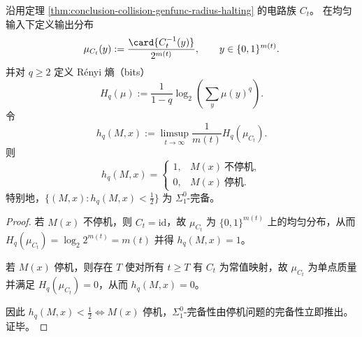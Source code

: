 \begin{corollary}\label{cor:conclusion-circuit-output-renyi-density-halting}
沿用定理 \ref{thm:conclusion-collision-genfunc-radius-halting} 的电路族 \(C_t\)。
在均匀输入下定义输出分布
\[
\mu_{C_t}(y):=\frac{\card{C_t^{-1}(y)}}{2^{m(t)}},\qquad y\in\{0,1\}^{m(t)}.
\]
并对 \(q\ge 2\) 定义 Rényi 熵（bits）
\[
H_q(\mu):=\frac{1}{1-q}\log_2\!\left(\sum_y \mu(y)^q\right).
\]
令
\[
h_q(M,x):=\limsup_{t\to\infty}\frac{1}{m(t)}H_q(\mu_{C_t}).
\]
则
\[
h_q(M,x)=
\begin{cases}
1,&M(x)\ \text{不停机},\\[2pt]
0,&M(x)\ \text{停机}.
\end{cases}
\]
特别地，\(\{(M,x):h_q(M,x)<\frac12\}\) 为 \(\Sigma^0_1\)-完备。
\end{corollary}
\begin{proof}
若 \(M(x)\) 不停机，则 \(C_t=\mathrm{id}\)，故 \(\mu_{C_t}\) 为 \(\{0,1\}^{m(t)}\) 上的均匀分布，从而
\(
H_q(\mu_{C_t})=\log_2 2^{m(t)}=m(t)
\)
并得 \(h_q(M,x)=1\)。

若 \(M(x)\) 停机，则存在 \(T\) 使对所有 \(t\ge T\) 有 \(C_t\) 为常值映射，故 \(\mu_{C_t}\) 为单点质量并满足 \(H_q(\mu_{C_t})=0\)，从而 \(h_q(M,x)=0\)。

因此 \(h_q(M,x)<\tfrac12\iff M(x)\) 停机，\(\Sigma^0_1\)-完备性由停机问题的完备性立即推出。证毕。
\end{proof}

